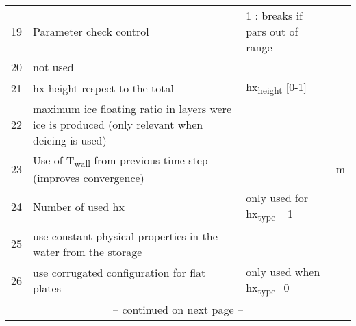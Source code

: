 \documentclass[english]{SPFReport}
\begin{document}
\begin{tabular}{| l |  m{8cm} | l | l |}
  19 & Parameter check control &  1 : breaks if pars out of range & \\
20 & not used & &\\
 21 & hx height respect to the total & \si{hx_{height}}  [0-1]& - \\ 
 22 & maximum ice floating ratio in layers were ice is produced (only relevant when deicing is used) & &\\
 23 & Use of \si{T_{wall}} from previous time step (improves convergence) & &m\\
 24 & Number of used hx  & only used for \si{hx_{type}} =1 &\\
 25 & use constant physical properties in the water from the storage && \\
 26 & use corrugated configuration for flat plates  & only used when \si{hx_{type}}=0 &\\
 \multicolumn{4}{c}{\small -- continued on next page --} \\
\end{tabular}

\end{document}
